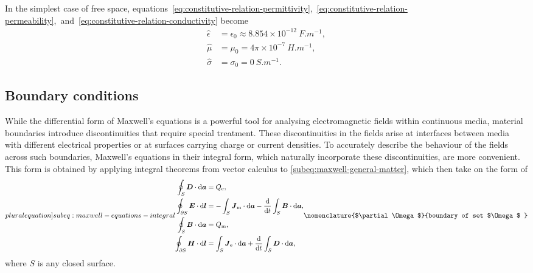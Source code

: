 \documentclass[11pt,a4paper,twoside,openany]{report}
\begin{document}
\begin{example}
    In the simplest case of free space, equations~\eqref{eq:constitutive-relation-permittivity},~\eqref{eq:constitutive-relation-permeability},~and~\eqref{eq:constitutive-relation-conductivity} become
    \begin{subequations}
        \begin{align}
            \hat\epsilon &= \epsilon_0 \approx 8.854\times 10^{-12}\ \unit{F.m^{-1}},
        \\
            \hat\mu &= \mu_0 = 4\pi\times 10^{-7}\ \unit{H.m^{-1}},
        \\
            \hat\sigma &= \sigma_0 = 0\ \unit{S.m^{-1}}.
        \end{align}
    \end{subequations}
\end{example}

\subsection{Boundary conditions}
While the differential form of Maxwell's equations is a powerful tool for analysing electromagnetic fields within continuous media, material boundaries introduce discontinuities that require special treatment. These discontinuities in the fields arise at interfaces between media with different electrical properties or at surfaces carrying charge or current densities. To accurately describe the behaviour of the fields across such boundaries, Maxwell's equations in their integral form, which naturally incorporate these discontinuities, are more convenient. This form is obtained by applying integral theorems from vector calculus to \cref{subeq:maxwell-general-matter}, which then take on the form of
\begin{subequations}
    \label[pluralequation]{subeq:maxwell-equations-integral}
    \begin{align}
        \label{eq:maxwell-equations-integral-div-d}
        \oint_S \vec D \cdot \d\vec a &= Q_{\mathrm{e}},
    \\
        \label{eq:maxwell-equations-integral-curl-e}
        \oint_{\partial S} \vec E \cdot \d\vec l &= -\int_S \vec J_{\mathrm m} \cdot \d\vec a - \frac{\d}{\d t}\int_S \vec B \cdot \d\vec a,
    \\
        \label{eq:maxwell-equations-integral-div-b}
        \oint_S \vec B \cdot \d\vec a &= Q_{\mathrm{m}},
    \\
        \label{eq:maxwell-equations-integral-curl-h}
        \oint_{\partial S} \vec H \cdot \d\vec l &= \int_S \vec J_{\mathrm e} \cdot \d\vec a + \frac{\d}{\d t}\int_S \vec D \cdot \d\vec a,
    \end{align}
    \nomenclature{$\partial\Omega$}{boundary of set $\Omega$ }%
\end{subequations}
where $S$ is any closed surface.
\end{document}
